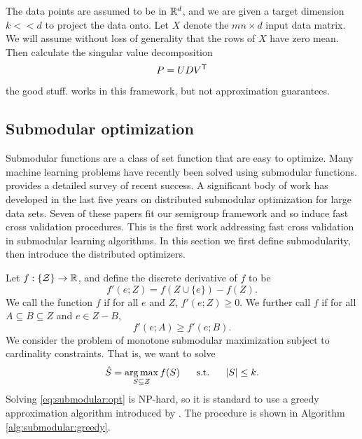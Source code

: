 \documentclass[thesis.tex]{subfiles}
\begin{document}
The data points are assumed to be in $\mathbb R^d$,
and we are given a target dimension $k<\!\!<d$ to project the data onto.
Let $X$ denote the $mn\times d$ input data matrix.
We will assume without loss of generality that the rows of $X$ have zero mean.
Then calculate the singular value decomposition 
\begin{equation}
    P = UD{V}^{\mathsf{T}}
\end{equation}


\cite{liang2013distributed} the good stuff.
\cite{qu2002principal} works in this framework, but not approximation guarantees.


\subsection{Submodular optimization}
\label{sec:merge:submodular}


Submodular functions are a class of set function that are easy to optimize.
Many machine learning problems have recently been solved using submodular functions.
\citet{mirzasoleiman2016distributed} provides a detailed survey of recent success.
A significant body of work has developed in the last five years on distributed submodular optimization for large data sets.
Seven of these papers fit our semigroup framework
and so induce fast cross validation procedures.
This is the first work addressing fast cross validation in submodular learning algorithms.
In this section we first define submodularity,
then introduce the distributed optimizers.

Let $f : \{{\mathcal Z}\} \to \mathbb R$,
and define the discrete derivative of $f$ to be
\begin{equation}
    f'(e; Z) = f (Z\cup\{e\}) - f(Z)
    .
\end{equation}
We call the function $f$  if for all $e$ and $Z$, $f'(e;Z) \ge 0$.
We further call $f$  if for all $A \subseteq B \subseteq Z$ and $e\in Z-B$,
\begin{equation}
    f'(e;A)\ge f'(e;B)
    .
\end{equation}
We consider the problem of monotone submodular maximization subject to cardinality constraints.
That is, we want to solve
\begin{equation}
    \label{eq:submodular:opt}
    \hat S =
    \operatorname*{arg\,max}_{S\subseteq Z} f(S)
    ~~~~~\text{s.t.}~~~~~
    |S|\le k
    .
\end{equation}
Solving \eqref{eq:submodular:opt} is NP-hard,
so it is standard to use a greedy approximation algorithm introduced by \citet{nemhauser1978analysis}.
The procedure is shown in Algorithm \ref{alg:submodular:greedy}.
\end{document}
